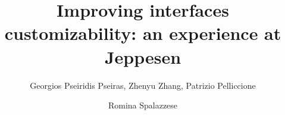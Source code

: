 \documentclass[twocolumn,]{elsarticle}
\begin{document}
\title{Improving interfaces customizability: an experience at Jeppesen} %

\author[CTH]{Georgios Pseiridis Pseiras, Zhenyu Zhang, Patrizio Pelliccione}

\author[MAL]{Romina Spalazzese}


\address[CTH]{Chalmers University of Technology | University of Gothenburg\\
Department of Computer Science and Engineering,
Gothenburg, Sweden}   



% 
\end{document}
